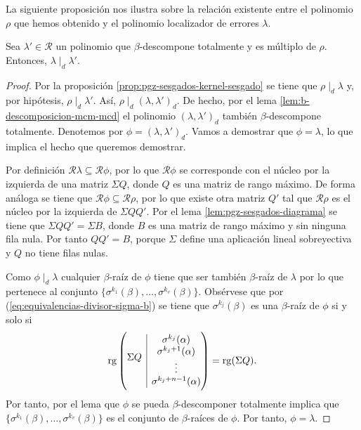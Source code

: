 La siguiente proposición nos ilustra sobre la relación existente entre el polinomio \(\rho\) que hemos obtenido y el polinomio localizador de errores \(\lambda\).

\begin{proposition}
  \label{prop:pgz-sesgados-lambda-b-descompone-multiplo-rho}
  Sea \(\lambda' \in \mathcal R\) un polinomio que \(\beta\)-descompone totalmente y es múltiplo de \(\rho\).
  Entonces, \(\lambda \mid_d \lambda'\).
\end{proposition}

\begin{proof}
  Por la proposición \ref{prop:pgz-sesgados-kernel-sesgado} se tiene que \(\rho \mid_d \lambda\) y, por hipótesis, \(\rho \mid_d \lambda'\).
  Así, \(\rho \mid_d (\lambda, \lambda')_{d}\).
  De hecho, por el lema \ref{lem:b-descomposicion-mcm-mcd} el polinomio \((\lambda, \lambda')_{d}\) también \(\beta\)-descompone totalmente.
  Denotemos por \(\phi = (\lambda, \lambda')_{d}\).
  Vamos a demostrar que \(\phi = \lambda\), lo que implica el hecho que queremos demostrar.

  Por definición \(\mathcal R \lambda \subseteq \mathcal R\phi\), por lo que \(\mathcal R\phi\) se corresponde con el núcleo por la izquierda de una matriz \(\Sigma Q\), donde \(Q\) es una matriz de rango máximo.
  De forma análoga se tiene que \(\mathcal R\phi \subseteq \mathcal R\rho\), por lo que existe otra matriz \(Q'\) tal que \(\mathcal R\rho\) es el núcleo por la izquierda de \(\Sigma QQ'\).
  Por el lema \ref{lem:pgz-sesgados-diagrama} se tiene que \(\Sigma QQ' = \Sigma B\), donde \(B\) es una matriz de rango máximo y sin ninguna fila nula.
  Por tanto \(QQ' = B\), porque \(\Sigma\) define una aplicación lineal sobreyectiva y \(Q\) no tiene filas nulas.

  Como \(\phi \mid_d \lambda\) cualquier \(\beta\)-raíz de \(\phi\) tiene que ser también \(\beta\)-raíz de \(\lambda\) por lo que pertenece al conjunto \(\{\sigma^{k_1}(\beta), \dots, \sigma^{k_v}(\beta)\}\).
  Obsérvese que por (\ref{eq:equivalencias-divisor-sigma-b}) se tiene que \(\sigma^{k_j}(\beta)\) es una \(\beta\)-raíz de \(\phi\) si y solo si
  \[
    \rank\left( \begin{array}{@{}c|c@{}}
      \multirow{4}{*}{\(\Sigma Q\)} & \sigma^{k_j}(\alpha)\\
       & \sigma^{k_j + 1}(\alpha)\\
       & \vdots \\
       & \sigma^{k_j + n - 1}(\alpha)
    \end{array}\right) = \rank(\Sigma Q).
  \]
  Por tanto, por el lema \parencite[Lema 2.3]{gomez-torrecillas_petersongorensteinzierler_2018} que \(\phi\) se pueda \(\beta\)-descomponer totalmente implica que \(\{\sigma^{k_1}(\beta), \dots, \sigma^{k_v}(\beta)\}\) es el conjunto de \(\beta\)-raíces de \(\phi\).
  Por tanto, \(\phi = \lambda\).
\end{proof}

